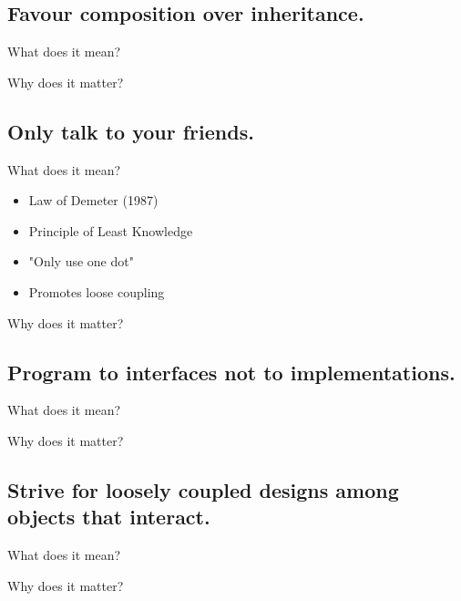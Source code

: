 \documentclass{beamer}
\begin{document}
\begin{frame}{}
    
\end{frame}

\begin{frame}{}
    
\end{frame}

\begin{frame}{}
    
\end{frame}

\subsection{Favour composition over inheritance.}

\begin{frame}{What does it mean?}
\end{frame}

\begin{frame}{Why does it matter?}
\end{frame}

\subsection{Only talk to your friends.}


\begin{frame}{What does it mean?}
    \begin{itemize}
        \item Law of Demeter (1987)
        \item Principle of Least Knowledge
        \item "Only use one dot"
        \item Promotes loose coupling
    \end{itemize}
\end{frame}

\begin{frame}{Why does it matter?}
\end{frame}

\subsection{Program to interfaces not to implementations.}

\begin{frame}{What does it mean?}
\end{frame}

\begin{frame}{Why does it matter?}
\end{frame}

\subsection{Strive for loosely coupled designs among objects that interact.}

\begin{frame}{What does it mean?}
\end{frame}

\begin{frame}{Why does it matter?}
\end{frame}
\end{document}
